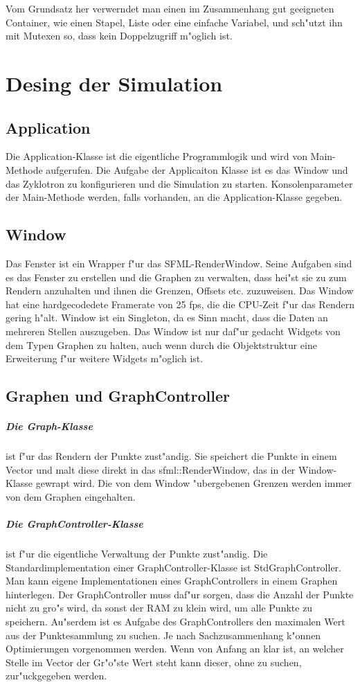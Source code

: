 \documentclass[14pt, a4paper]{report}
\begin{document}
Vom Grundsatz her verwerndet man einen im Zusammenhang gut geeigneten Container, wie
einen Stapel, Liste oder eine einfache Variabel, und sch"utzt ihn mit Mutexen so, dass 
kein Doppelzugriff m"oglich ist.

\chapter{Desing der Simulation}
\section{Application}
Die Application-Klasse ist die eigentliche Programmlogik und wird von Main-Methode
aufgerufen. Die Aufgabe der Applicaiton Klasse ist es das Window und das Zyklotron
zu konfigurieren und die Simulation zu starten. Konsolenparameter der Main-Methode
werden, falls vorhanden, an die Application-Klasse gegeben.

\section{Window} 
Das Fenster ist ein Wrapper f"ur das SFML-RenderWindow. Seine Aufgaben sind es das 
Fenster zu erstellen und die Graphen zu verwalten, dass hei"st sie zu zum Rendern 
anzuhalten und ihnen die Grenzen, Offsets etc. zuzuweisen. Das Window hat eine 
hardgecodedete Framerate von 25 fps, die die CPU-Zeit f"ur das Rendern gering h"alt.
Window ist ein Singleton, da es Sinn macht, dass die Daten an mehreren Stellen 
auszugeben. Das Window ist nur daf"ur gedacht Widgets von dem Typen Graphen zu halten,
auch wenn durch die Objektstruktur eine Erweiterung f"ur weitere Widgets m"oglich ist.

\section{Graphen und GraphController}
\paragraph{Die Graph-Klasse} ist f"ur das Rendern der Punkte zust"andig. Sie speichert
die Punkte in einem Vector und malt diese direkt in das sfml::RenderWindow, das in der
Window-Klasse gewrapt wird. Die von dem Window "ubergebenen Grenzen werden immer von dem
Graphen eingehalten.

\paragraph{Die GraphController-Klasse} ist f"ur die eigentliche Verwaltung der Punkte
zust"andig. Die Standardimplementation einer GraphController-Klasse ist 
StdGraphController. Man kann eigene Implementationen eines GraphControllers in einem
Graphen hinterlegen. Der GraphController muss daf"ur sorgen, dass die Anzahl der Punkte
nicht zu gro"s wird, da sonst der RAM zu klein wird, um alle Punkte zu speichern. 
Au"serdem ist es Aufgabe des GraphControllers den maximalen Wert aus der Punktesammlung
zu suchen. Je nach Sachzusammenhang k"onnen Optimierungen vorgenommen werden. Wenn von
Anfang an klar ist, an welcher Stelle im Vector der Gr"o"ste Wert steht kann dieser,
ohne zu suchen, zur"uckgegeben werden.
\end{document}
